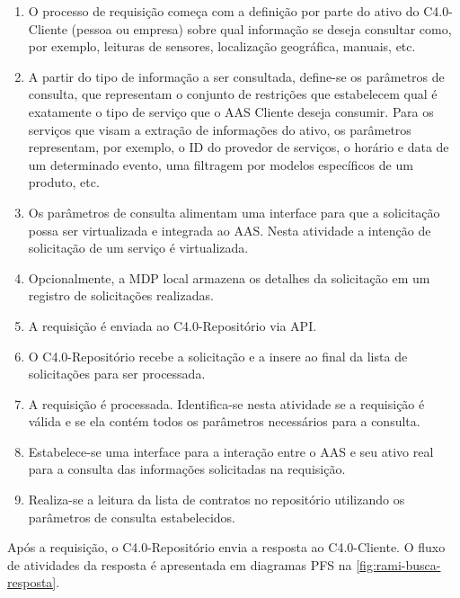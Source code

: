	\begin{enumerate}
		
		\item O processo de requisição começa com a definição por parte do ativo do C4.0-Cliente (pessoa ou empresa) sobre qual informação se deseja consultar como, por exemplo, leituras de sensores, localização geográfica, manuais, etc.
		
		\item A partir do tipo de informação a ser consultada, define-se os parâmetros de consulta, que representam o conjunto de restrições que estabelecem qual é exatamente o tipo de serviço que o AAS Cliente deseja consumir. Para os serviços que visam a extração de informações do ativo, os parâmetros representam, por exemplo, o ID do provedor de serviços, o horário e data de um determinado evento, uma filtragem por modelos específicos de um produto, etc.
		
		\item Os parâmetros de consulta alimentam uma interface para que a solicitação possa ser virtualizada e integrada ao AAS. Nesta atividade a intenção de solicitação de um serviço é virtualizada.
		
		\item Opcionalmente, a MDP local armazena os detalhes da solicitação em um registro de solicitações realizadas.
		
		\item A requisição é enviada ao C4.0-Repositório via API.
		
		\item O C4.0-Repositório recebe a solicitação e a insere ao final da lista de solicitações para ser processada.
		
		\item A requisição é processada. Identifica-se nesta atividade se a requisição é válida e se ela contém todos os parâmetros necessários para a consulta.
		
		\item Estabelece-se uma interface para a interação entre o AAS e seu ativo real para a consulta das informações solicitadas na requisição.
		
		\item Realiza-se a leitura da lista de contratos no repositório utilizando os parâmetros de consulta estabelecidos.
		
	\end{enumerate}

	Após a requisição, o C4.0-Repositório envia a resposta ao C4.0-Cliente. O fluxo de atividades da resposta é apresentada em diagramas PFS na \autoref{fig:rami-busca-resposta}.

